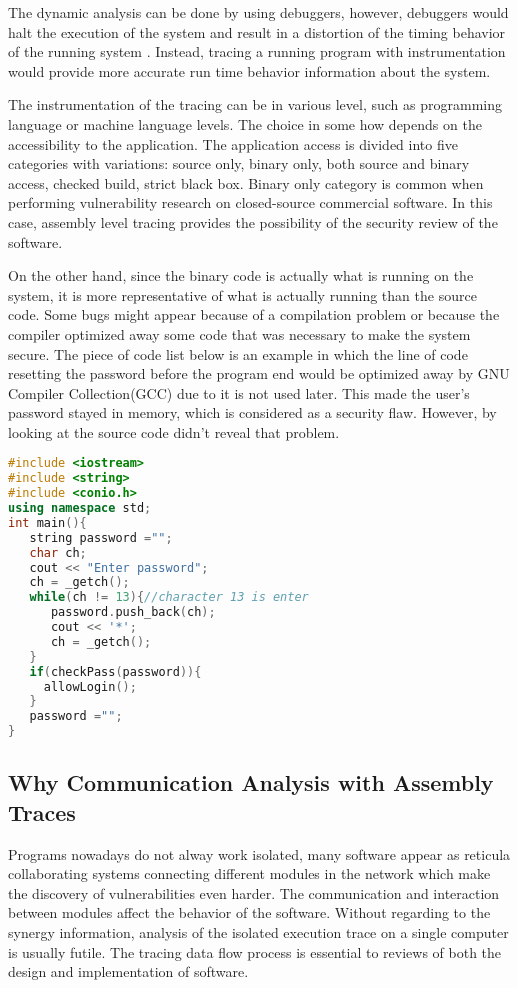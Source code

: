 The dynamic analysis can be done by using debuggers, however, debuggers would halt the execution of the system and result in a distortion of the timing behavior of the running system \cite{trumper2012maintenance}. Instead, tracing a running program with instrumentation would provide more accurate run time behavior information about the system.

The instrumentation of the tracing can be in various level, such as programming language or machine language levels. The choice in some how depends on the accessibility to the application. The application access is divided into five categories with variations: source only, binary only, both source and binary access, checked build, strict black box. Binary only category is common when performing vulnerability research on closed-source commercial software.\cite{dowd_art_2006} In this case, assembly level tracing provides the possibility of the security review of the software.

On the other hand, since the binary code is actually what is running on the system, it is more representative of what is actually running than the source code.  Some bugs might appear because of a compilation problem or because the compiler optimized away some code that was
necessary to make the system secure. The piece of code list below is an example in which the line of code resetting the password before the program end would be optimized away by GNU Compiler Collection(GCC) due to it is not used later. This made the user's password stayed in memory, which is considered as a security flaw. However, by looking at the source code didn't reveal that problem.

\begin{lstlisting}[language=C++, caption= Password Fetching Example ]
#include <iostream>
#include <string>
#include <conio.h>
using namespace std;
int main(){
   string password ="";
   char ch;
   cout << "Enter password";
   ch = _getch();
   while(ch != 13){//character 13 is enter
      password.push_back(ch);
      cout << '*';
      ch = _getch();
   }   
   if(checkPass(password)){
     allowLogin();
   }  
   password ="";
}
\end{lstlisting}


\subsection{Why Communication Analysis with Assembly Traces}
Programs nowadays do not alway work isolated,  many software  appear as  reticula collaborating systems connecting different modules in the network\cite{PhysRevE.68.046116} which make the discovery of vulnerabilities even harder. The communication and interaction between modules affect the behavior of the software. Without regarding to the synergy information, analysis of the isolated execution trace on a single computer is usually futile. The tracing data flow process is essential to reviews of both the design and implementation of software.

